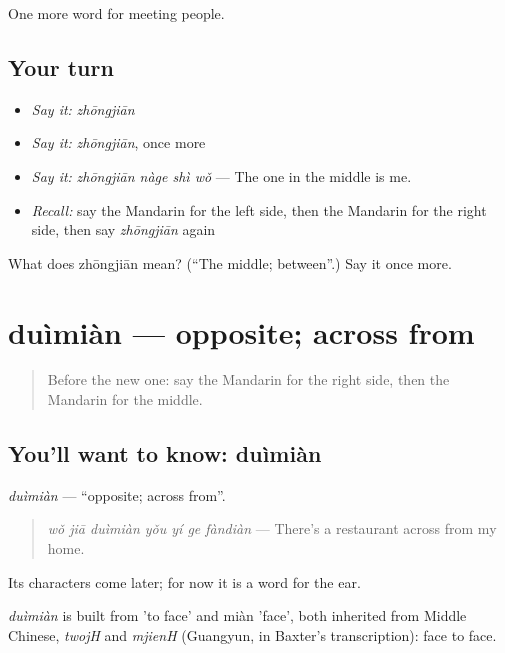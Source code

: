\begin{grammarlens}[title={What you've built}]
One more word for meeting people.
\end{grammarlens}

\subsection*{Your turn}
\begin{itemize}
\raggedright
  \item \emph{Say it:} \emph{zhōngjiān}
  \item \emph{Say it:} \emph{zhōngjiān}, once more
  \item \emph{Say it:} \emph{zhōngjiān nàge shì wǒ} — The one in the middle is me.
  \item \emph{Recall:} say the Mandarin for the left side, then the Mandarin for the right side, then say \emph{zhōngjiān} again
\end{itemize}

\begin{tcolorbox}[breakable,colback=teal!4,colframe=teal!35!black,title={Before you move on}]
What does zhōngjiān mean? (\textquotedblleft{}The middle; between\textquotedblright{}.) Say it once more.
\end{tcolorbox}
\section[duìmiàn]{duìmiàn — opposite; across from}

\label{lesson:ZH-C82-duimian}



\begin{quote}
Before the new one: say the Mandarin for the right side, then the Mandarin for the middle.
\end{quote}

\subsection*{You'll want to know: duìmiàn}
\emph{duìmiàn} — \textquotedblleft{}opposite; across from\textquotedblright{}.

\begin{quote}
\emph{wǒ jiā duìmiàn yǒu yí ge fàndiàn} — There's a restaurant across from my home.
\end{quote}

Its characters come later; for now it is a word for the ear.

\begin{cousinweb}
\emph{duìmiàn} is built from  'to face' and miàn 'face', both inherited from Middle Chinese, \emph{twojH} and \emph{mjienH} (Guangyun, in Baxter's transcription): face to face.
\end{cousinweb}

